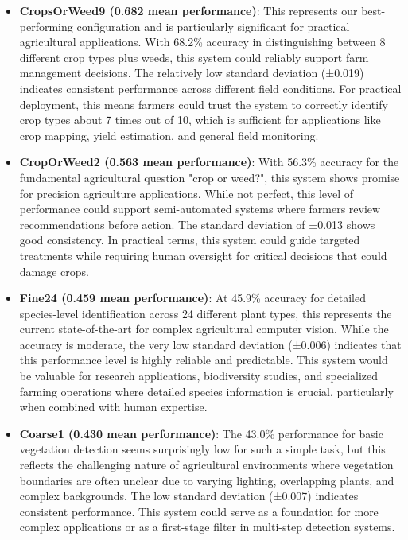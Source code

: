 \begin{itemize}
    \item \textbf{CropsOrWeed9 (0.682 mean performance)}: This represents our best-performing configuration and is particularly significant for practical agricultural applications. With 68.2\% accuracy in distinguishing between 8 different crop types plus weeds, this system could reliably support farm management decisions. The relatively low standard deviation (±0.019) indicates consistent performance across different field conditions. For practical deployment, this means farmers could trust the system to correctly identify crop types about 7 times out of 10, which is sufficient for applications like crop mapping, yield estimation, and general field monitoring.
    
    \item \textbf{CropOrWeed2 (0.563 mean performance)}: With 56.3\% accuracy for the fundamental agricultural question "crop or weed?", this system shows promise for precision agriculture applications. While not perfect, this level of performance could support semi-automated systems where farmers review recommendations before action. The standard deviation of ±0.013 shows good consistency. In practical terms, this system could guide targeted treatments while requiring human oversight for critical decisions that could damage crops.
    
    \item \textbf{Fine24 (0.459 mean performance)}: At 45.9\% accuracy for detailed species-level identification across 24 different plant types, this represents the current state-of-the-art for complex agricultural computer vision. While the accuracy is moderate, the very low standard deviation (±0.006) indicates that this performance level is highly reliable and predictable. This system would be valuable for research applications, biodiversity studies, and specialized farming operations where detailed species information is crucial, particularly when combined with human expertise.
    
    \item \textbf{Coarse1 (0.430 mean performance)}: The 43.0\% performance for basic vegetation detection seems surprisingly low for such a simple task, but this reflects the challenging nature of agricultural environments where vegetation boundaries are often unclear due to varying lighting, overlapping plants, and complex backgrounds. The low standard deviation (±0.007) indicates consistent performance. This system could serve as a foundation for more complex applications or as a first-stage filter in multi-step detection systems.
\end{itemize}

